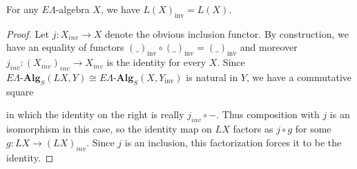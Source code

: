 \documentclass{amsbook} %
\newcommand{\mb}{\mathbf}
\numberwithin{section}{chapter}
\begin{document}
\begin{prop} \label{linveql} For any $E\Lambda$-algebra $X$, we have $L(X)_{\mathrm{inv}} = L(X)$.
\end{prop}
\begin{proof}
Let $j: X_{inv} \to X$ denote the obvious inclusion functor. By construction, we have an equality of functors $(\_)_{\mathrm{inv}} \circ (\_)_{\mathrm{inv}} = (\_)_{\mathrm{inv}}$ and moreover $j_{inv}: (X_{inv})_{inv} \to X_{inv}$ is the identity for every $X$. Since $E\Lambda\mbox{-}\mb{Alg}_S(LX , Y)\cong E\Lambda\mbox{-}\mb{Alg}_S(X, Y_{\mathrm{inv}})$ is natural in $Y$, we have a commutative square
\begin{center}
    \end{center}
in which the identity on the right is really $j_{inv} \circ -$. Thus composition with $j$ is an isomorphism in this case, so the identity map on $LX$ factors as $j \circ g$ for some $g: LX \to (LX)_{inv}$. Since $j$ is an inclusion, this factorization forces it to be the identity.



\end{proof}
\end{document}
